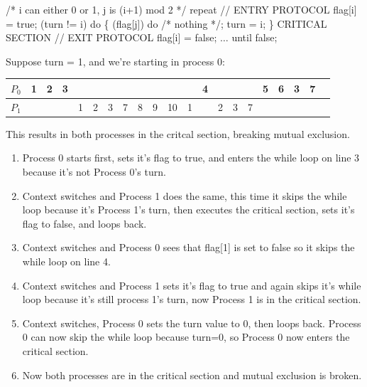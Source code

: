 \documentclass[11pt]{article}
\newcommand{\n}{\vspace{0.3cm}}
\begin{document}
\begin{enumerate}
    \begin{codebox}
     \zi /* i can either 0 or 1, j is (i+1) mod 2 */
     \li repeat \Do
        \zi // ENTRY PROTOCOL
        \li flag[i] = true;
        \li \While (turn != i) do \{\Do
          \li \While (flag[j]) do /* nothing */;
          \li turn = i;
        \End
        \li \}
        \li CRITICAL SECTION
        \zi // EXIT PROTOCOL
        \li flag[i] = false;
        \li \(\hdots\)
     \End
     \li until false;
    \end{codebox}
    Suppose turn = 1, and we're starting in process 0:

    \begin{tabular}{|c|c|c|c|c|c|c|c|c|c|c|c|c|c|c|c|c|c|c|c|c|}
      \hline
      \(P_0\) & 1 & 2 & 3 &   &   &   &   &   &   &    &   & 4 &   &   &   & 5 & 6 & 3 & 7 \\
      \hline
      \(P_1\) &   &   &   & 1 & 2 & 3 & 7 & 8 & 9 & 10 & 1 &   & 2 & 3 & 7 &   &   &   &   \\
      \hline
    \end{tabular}

    This results in both processes in the critcal section, breaking mutual exclusion. \n

    \begin{enumerate}[label=\arabic*)]
      \item Process 0 starts first, sets it's flag to true, and enters the while loop on line 3 because it's not Process 0's turn.
      \item Context switches and Process 1 does the same, this time it skips the while loop because it's Process 1's turn, then executes the critical section, sets it's flag to false, and loops back.
      \item Context switches and Process 0 sees that flag[1] is set to false so it skips the while loop on line 4.
      \item Context switches and Process 1 sets it's flag to true and again skips it's while loop because it's still process 1's turn, now Process 1 is in the critical section.
      \item Context switches, Process 0 sets the turn value to 0, then loops back.  Process 0 can now skip the while loop because turn=0, so Process 0 now enters the critical section.
      \item Now both processes are in the critical section and mutual exclusion is broken.
    \end{enumerate}
    \newpage


\end{enumerate}
\end{document}
